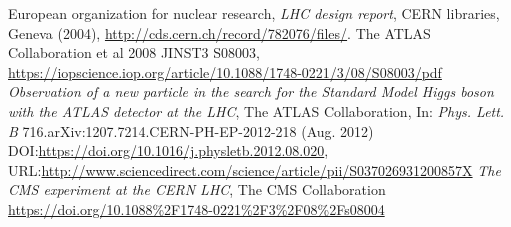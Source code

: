 \documentclass[a4paper, oneside, 11pt]{book}
\begin{document}
	\begin{thebibliography}{3}
		European organization for nuclear research, \textit{LHC design report}, CERN libraries, Geneva (2004), \url{http://cds.cern.ch/record/782076/files/}.
		The ATLAS Collaboration et al 2008 JINST3 S08003,
		\url{https://iopscience.iop.org/article/10.1088/1748-0221/3/08/S08003/pdf}
		\textit{Observation of a new particle in the search for the Standard Model Higgs boson with the ATLAS detector at the LHC},
		The ATLAS Collaboration, In: \textit{Phys. Lett. B} 716.arXiv:1207.7214.CERN-PH-EP-2012-218 (Aug. 2012) DOI:\url{https://doi.org/10.1016/j.physletb.2012.08.020}, URL:\url{http://www.sciencedirect.com/science/article/pii/S037026931200857X}
		\textit{The CMS experiment at the CERN LHC}, The CMS Collaboration
		\url{https://doi.org/10.1088%2F1748-0221%2F3%2F08%2Fs08004}
	\end{thebibliography}
	
\end{document}
